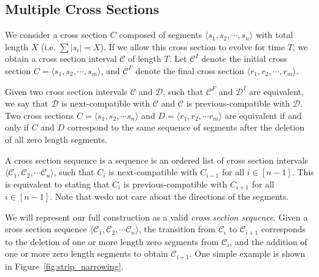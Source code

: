 \subsection{Multiple Cross Sections}
\label{sec:intervals}


\begin{definition}
\label{def:interval}
We consider a cross section $C$ composed of segments $ \langle s_1,s_2,\cdots,s_n \rangle$
with total length $X$ (i.e. $\sum \left| s_i\right| = X$).
If we allow this cross section to evolve for time $T$, we obtain a cross section interval $\mathcal C$ of length $T$.
Let $\mathcal C^I$ denote the initial cross section $C = \langle s_1,s_2,\cdots ,s_m \rangle$,
and $\mathcal C^F$ denote the final cross section $ \langle r_1,r_2,\cdots ,r_m \rangle$.
\end{definition}

\begin{definition}
\label{def:compatible}
Given two cross section intervals $\mathcal C$ and $\mathcal D$, such that $\mathcal C^F$ and $\mathcal D^I$ are equivalent,
we say that $\mathcal D$ is next-compatible with $\mathcal C$ and $\mathcal C$ is previous-compatible with $\mathcal D$.
Two cross sections $C = \langle s_1, s_2,\cdots s_n \rangle$ and $D = \langle r_1, r_2,\cdots r_m \rangle$ are equivalent
if and only if $C$ and $D$ correspond to the same sequence of segments after the deletion of all zero length segments.
\end{definition}

\begin{definition}
\label{def:cross_section_sequence}
A cross section sequence is a sequence is an ordered list of cross section intervals $ \langle \mathcal C_1, \mathcal C_2,\cdots \mathcal C_n \rangle$,
such that $C_{i}$ is next-compatible with $C_{i-1}$ for all $i\in [n-1]$.
This is equivalent to stating that $C_{i}$ is previous-compatible with $C_{i+1}$ for all $i\in [n-1]$.
Note that wedo not care about the directions of the segments.
\end{definition}

We will represent our full construction as a valid \emph{cross section sequence}.
Given a sross section sequence $\langle \mathcal C_1, \mathcal C_2,\cdots \mathcal C_n \rangle$,
the transition from $\mathcal C_i$ to $\mathcal C_{i+1}$ corresponds to the deletion of one or more
length zero segments from $\mathcal C_i$, and the addition of one or more zero length segments to obtain $\mathcal C_{i+1}$.
One simple example is shown in Figure~\ref{fig:strip_narrowing}.

